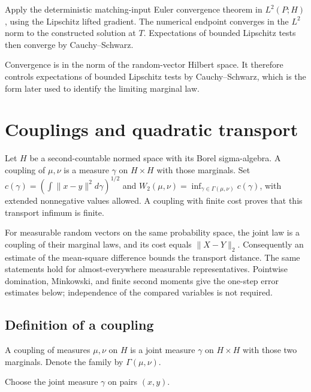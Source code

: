 \documentclass[11pt,a4paper]{report}
\begin{document}
Apply the deterministic matching-input Euler convergence theorem in \(L^2(P;H)\), using the Lipschitz lifted gradient. The numerical endpoint converges in the \(L^2\) norm to the constructed solution at \(T\). Expectations of bounded Lipschitz tests then converge by Cauchy–Schwarz.



Convergence is in the norm of the random-vector Hilbert space. It therefore controls expectations of bounded Lipschitz tests by Cauchy–Schwarz, which is the form later used to identify the limiting marginal law.

\section{\texorpdfstring{Couplings and quadratic transport}{Couplings and quadratic transport}}
\label{proof-module-UnadjustedLangevin-Coupling-lean}


Let \(H\) be a second-countable normed space with its Borel sigma-algebra. A coupling of \(\mu,\nu\) is a measure \(\gamma\) on \(H\times H\) with those marginals. Set \(c(\gamma)=(\int\|x-y\|^2d\gamma)^{1/2}\) and \(W_2(\mu,\nu)=\inf_{\gamma\in\Gamma(\mu,\nu)}c(\gamma)\), with extended nonnegative values allowed. A coupling with finite cost proves that this transport infimum is finite.



For measurable random vectors on the same probability space, the joint law is a coupling of their marginal laws, and its cost equals \(\|X-Y\|_2\). Consequently an estimate of the mean-square difference bounds the transport distance. The same statements hold for almost-everywhere measurable representatives. Pointwise domination, Minkowski, and finite second moments give the one-step error estimates below; independence of the compared variables is not required.

\subsection{\texorpdfstring{Definition of a coupling}{Definition of a coupling}}
\label{report-step-UnadjustedLangevin-Coupling-lean-1}


A coupling of measures \(\mu,\nu\) on \(H\) is a joint measure \(\gamma\) on \(H\times H\) with those two marginals. Denote the family by \(\Gamma(\mu,\nu)\).



Choose the joint measure \(\gamma\) on pairs \((x,y)\).
\end{document}
